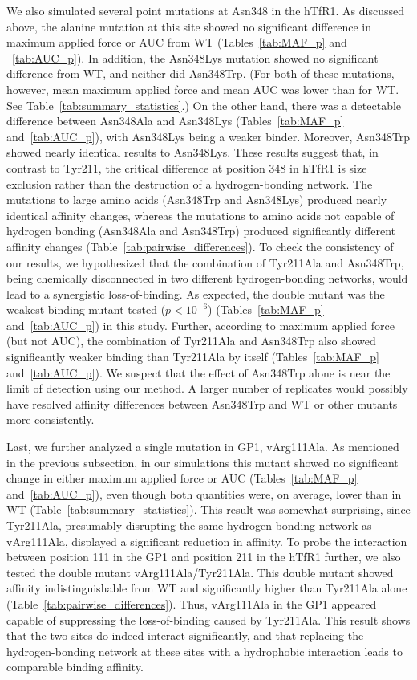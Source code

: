 \documentclass[12pt]{article}
\begin{document}
We also simulated several point mutations at Asn348 in the hTfR1. As discussed above, the alanine mutation at this site showed no significant difference in maximum applied force or AUC from WT (Tables~\ref{tab:MAF_p} and ~\ref{tab:AUC_p}). In addition, the Asn348Lys mutation showed no significant difference from WT, and neither did Asn348Trp. (For both of these mutations, however, mean maximum applied force and mean AUC was lower than for WT. See Table~\ref{tab:summary_statistics}.)  On the other hand, there was a detectable difference between Asn348Ala and Asn348Lys (Tables~\ref{tab:MAF_p} and~\ref{tab:AUC_p}), with Asn348Lys being a weaker binder. Moreover, Asn348Trp showed nearly identical results to Asn348Lys. These results suggest that, in contrast to Tyr211, the critical difference at position 348 in hTfR1 is size exclusion rather than the destruction of a hydrogen-bonding network. The mutations to large amino acids (Asn348Trp and Asn348Lys) produced nearly identical affinity changes, whereas the mutations to amino acids not capable of hydrogen bonding (Asn348Ala and Asn348Trp) produced significantly different affinity changes (Table~\ref{tab:pairwise_differences}). To check the consistency of our results, we hypothesized that the combination of Tyr211Ala and Asn348Trp, being chemically disconnected in two different hydrogen-bonding networks, would lead to a synergistic loss-of-binding. As expected, the double mutant was the weakest binding mutant tested ($ p < 10^{-6} $) (Tables~\ref{tab:MAF_p} and~\ref{tab:AUC_p}) in this study. Further, according to maximum applied force (but not AUC), the combination of Tyr211Ala and Asn348Trp also showed significantly weaker binding than Tyr211Ala by itself (Tables~\ref{tab:MAF_p} and~\ref{tab:AUC_p}). We suspect that the effect of Asn348Trp alone is near the limit of detection using our method. A larger number of replicates would possibly have resolved affinity differences between Asn348Trp and WT or other mutants more consistently.

Last, we further analyzed a single mutation in GP1, vArg111Ala. As mentioned in the previous subsection, in our simulations this mutant showed no significant change in either maximum applied force or AUC (Tables~\ref{tab:MAF_p} and~\ref{tab:AUC_p}), even though both quantities were, on average, lower than in WT (Table~\ref{tab:summary_statistics}). This result was somewhat surprising, since Tyr211Ala, presumably disrupting the same hydrogen-bonding network as vArg111Ala, displayed a significant reduction in affinity. To probe the interaction between position 111 in the GP1 and position 211 in the hTfR1 further, we also tested the double mutant vArg111Ala/Tyr211Ala. This double mutant showed affinity indistinguishable from WT and significantly higher than Tyr211Ala alone  (Table~\ref{tab:pairwise_differences}). Thus, vArg111Ala in the GP1 appeared capable of suppressing the loss-of-binding caused by Tyr211Ala. This result shows that the two sites do indeed interact significantly, and that replacing the hydrogen-bonding network at these sites with a hydrophobic interaction leads to comparable binding affinity.
\end{document}

